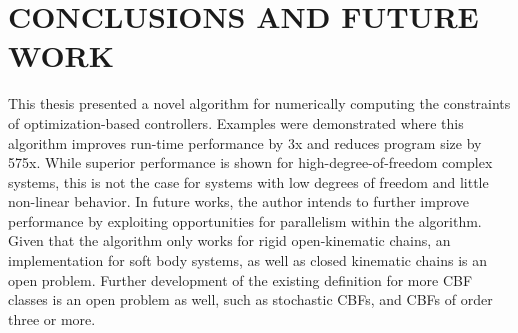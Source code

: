 \chapter{CONCLUSIONS AND FUTURE WORK} \label{chap:conclusions}
This thesis presented a novel algorithm for numerically computing the constraints of optimization-based controllers. Examples were demonstrated where this algorithm improves run-time performance by 3x and reduces program size by 575x. While superior performance is shown for high-degree-of-freedom complex systems, this is not the case for systems with low degrees of freedom and little non-linear behavior. In future works, the author intends to further improve performance by exploiting opportunities for parallelism within the algorithm. Given that the algorithm only works for rigid open-kinematic chains, an implementation for soft body systems, as well as closed kinematic chains is an open problem. Further development of the existing \algname{} definition for more CBF classes is an open problem as well, such as stochastic CBFs, and CBFs of order three or more.